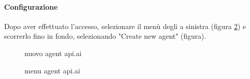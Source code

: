 \paragraph{Configurazione}
Dopo aver effettuato l'accesso, selezionare il menù degli  a sinistra (figura \ref{fig:menuapi}) e scorrerlo fino in fondo, selezionando "Create new agent" (figura). \\
\begin{figure}[h]\label{fig:menuapi}
	\caption{nuovo agent api.ai}
\end{figure}
\begin{figure}[h]\label{fig:menuapi}
	\caption{menu agent api.ai}
\end{figure}

